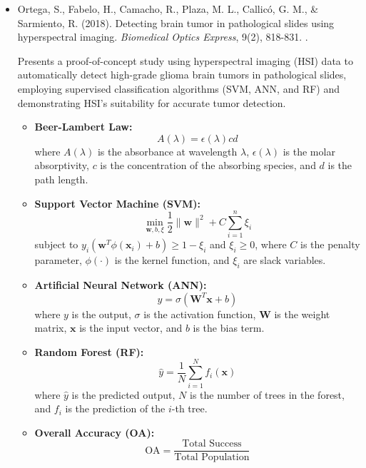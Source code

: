 \documentclass[10pt,svgnames,fragile]{beamer}
\begin{document}
\begin{frame}
\tiny
\begin{itemize}

    \item Ortega, S., Fabelo, H., Camacho, R., Plaza, M. L., Callicó, G. M., \& Sarmiento, R. (2018). Detecting brain tumor in pathological slides using hyperspectral imaging. \textit{Biomedical Optics Express}, 9(2), 818-831. \href{https://doi.org/10.1364/BOE.9.000818}{\color{blue}{DOI: 10.1364/BOE.9.000818}}. \cite{ortegaDetectingBrainTumor2018}

    {\color{gray}Presents a proof-of-concept study using hyperspectral imaging (HSI) data to automatically detect high-grade glioma brain tumors in pathological slides, employing supervised classification algorithms (SVM, ANN, and RF) and demonstrating HSI's suitability for accurate tumor detection.}
    \begin{itemize} \tiny
        \item \textbf{Beer-Lambert Law:}
    \[
    A(\lambda) = \epsilon(\lambda) c d
    \]
    where \( A(\lambda) \) is the absorbance at wavelength \( \lambda \), \( \epsilon(\lambda) \) is the molar absorptivity, \( c \) is the concentration of the absorbing species, and \( d \) is the path length.

    \item \textbf{Support Vector Machine (SVM):}
    \[
    \min_{\mathbf{w}, b, \xi} \frac{1}{2} \|\mathbf{w}\|^2 + C \sum_{i=1}^n \xi_i
    \]
    subject to \( y_i (\mathbf{w}^T \phi(\mathbf{x}_i) + b) \geq 1 - \xi_i \) and \( \xi_i \geq 0 \), where \( C \) is the penalty parameter, \( \phi(\cdot) \) is the kernel function, and \( \xi_i \) are slack variables.

    \item \textbf{Artificial Neural Network (ANN):}
    \[
    y = \sigma(\mathbf{W}^T \mathbf{x} + b)
    \]
    where \( y \) is the output, \( \sigma \) is the activation function, \( \mathbf{W} \) is the weight matrix, \( \mathbf{x} \) is the input vector, and \( b \) is the bias term.

    \item \textbf{Random Forest (RF):}
    \[
    \hat{y} = \frac{1}{N} \sum_{i=1}^N f_i(\mathbf{x})
    \]
    where \( \hat{y} \) is the predicted output, \( N \) is the number of trees in the forest, and \( f_i \) is the prediction of the \( i \)-th tree.

    \item \textbf{Overall Accuracy (OA):}
    \[
    \text{OA} = \frac{\text{Total Success}}{\text{Total Population}}
    \]
    \end{itemize}

\end{itemize}
\end{frame}
\end{document}
